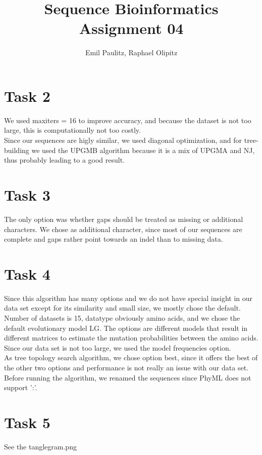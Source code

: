 \documentclass[10pt,a4paper]{article}
\author{Emil Paulitz, Raphael Olipitz}
\title{Sequence Bioinformatics\\Assignment 04}
\begin{document}
	\ohead{\theauthor}
	\cfoot{\pagemark}
	\maketitle
	\section*{Task 2}
		We used maxiters = 16 to improve accuracy, and because the dataset is not too large, this is computationally not too costly.\\
		Since our sequences are higly similar, we used diagonal optimization, and for tree-building we used the UPGMB algorithm because it is a mix of UPGMA and NJ, thus probably leading to a good result. 
	\section*{Task 3}
		The only option was whether gaps should be treated as missing or additional characters. We chose as additional character, since most of our sequences are complete and gaps rather point towards an indel than to missing data.
	\section*{Task 4}
		Since this algorithm has many options and we do not have special insight in our data set except for its similarity and small size, we mostly chose the default. \\
		Number of datasets is 15, datatype obviously amino acids, and we chose the default evolutionary model LG. The options are different models that result in different matrices to estimate the mutation probabilities between the amino acids. Since our data set is not too large, we used the model frequencies option.\\
		As tree topology search algorithm, we chose option best, since it offers the best of the other two options and performance is not really an issue with our data set. \\
		Before running the algorithm, we renamed the sequences since PhyML does not support ':'.
	\section*{Task 5}
		See the tanglegram.png
		
\end{document}

